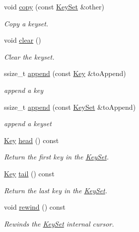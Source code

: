 \begin{DoxyCompactItemize}
void \hyperlink{classkdb_1_1KeySet_a28fd33fdaecf1d57d4dddac7058f5d38}{copy} (const \hyperlink{classkdb_1_1KeySet}{Key\+Set} \&other)
\begin{DoxyCompactList}\small\item\em Copy a keyset. \end{DoxyCompactList}\item 
void \hyperlink{classkdb_1_1KeySet_a38f5159e39758aa632421d2fe7440633}{clear} ()
\begin{DoxyCompactList}\small\item\em Clear the keyset. \end{DoxyCompactList}\item 
ssize\+\_\+t \hyperlink{classkdb_1_1KeySet_a0d4b2f3aa9f58d10053561135b50233e}{append} (const \hyperlink{classkdb_1_1Key}{Key} \&to\+Append)
\begin{DoxyCompactList}\small\item\em append a key \end{DoxyCompactList}\item 
ssize\+\_\+t \hyperlink{classkdb_1_1KeySet_ac9cbdc933d7171037d47c6d4d78595d1}{append} (const \hyperlink{classkdb_1_1KeySet}{Key\+Set} \&to\+Append)
\begin{DoxyCompactList}\small\item\em append a keyset \end{DoxyCompactList}\item 
\hyperlink{classkdb_1_1Key}{Key} \hyperlink{classkdb_1_1KeySet_a1aca3689ed08cbc909976cdf874cfb59}{head} () const
\begin{DoxyCompactList}\small\item\em Return the first key in the \hyperlink{classkdb_1_1KeySet}{Key\+Set}. \end{DoxyCompactList}\item 
\hyperlink{classkdb_1_1Key}{Key} \hyperlink{classkdb_1_1KeySet_a16deed50e0d8cfee023d4423a119df51}{tail} () const
\begin{DoxyCompactList}\small\item\em Return the last key in the \hyperlink{classkdb_1_1KeySet}{Key\+Set}. \end{DoxyCompactList}\item 
void \hyperlink{classkdb_1_1KeySet_a5bc5a16a726e959adaf3cf8506e7b849}{rewind} () const
\begin{DoxyCompactList}\small\item\em Rewinds the \hyperlink{classkdb_1_1KeySet}{Key\+Set} internal cursor. \end{DoxyCompactList}\item 

\end{DoxyCompactItemize}
